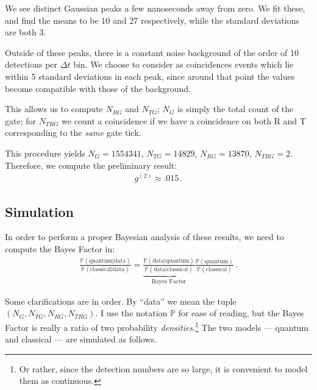 \documentclass[main.tex]{subfiles}
\begin{document}
We see distinct Gaussian peaks a few nanoseconds away from zero. We fit these, and find the means to be 10 and 27 respectively, while the standard deviations are both 3.

Outside of these peaks, there is a constant noise background of the order of 10 detections per \(\Delta t\) bin.
We choose to consider as coincidences events which lie within 5 standard deviations in each peak, since around that point the values become compatible with those of the background.

This allows us to compute \(N_{RG}\) and \(N_{TG}\); \(N_G\) is simply the total count of the gate; for \(N_{TRG}\) we count a coincidence if we have a coincidence on both R and T corresponding to the \emph{same} gate tick. 

This procedure yields \(N_G = 1554341\), \(N_{TG}=14829\), \(N_{RG}=13870\), \(N_{TRG}=2\).
Therefore, we compute the preliminary result:
%
\begin{align}
g^{(2)} \approx \num{.015}
\,.
\end{align}

\subsection{Simulation}

In order to perform a proper Bayesian analysis of these results, we need to compute the Bayes Factor in: 
%
\begin{align}
\frac{\mathbb{P}(\text{quantum} | \text{data})}{\mathbb{P}(\text{classical} | \text{data})}
= \underbrace{\frac{\mathbb{P}(\text{data} | \text{quantum})}{\mathbb{P}(\text{data} | \text{classical})}}_{\text{Bayes Factor}}
\frac{\mathbb{P}(\text{quantum})}{\mathbb{P}(\text{classical})}
\,.
\end{align}

Some clarifications are in order. By ``data'' we mean the tuple \((N_G, N_{TG}, N_{RG}, N_{TRG})\). I use the notation \(\mathbb{P}\) for ease of reading, but the Bayes Factor is really a ratio of two probability \emph{densities}.\footnote{Or rather, since the detection numbers are so large, it is convenient to model them as continuous.}
The two models --- quantum and classical --- are simulated as follows.
\end{document}
